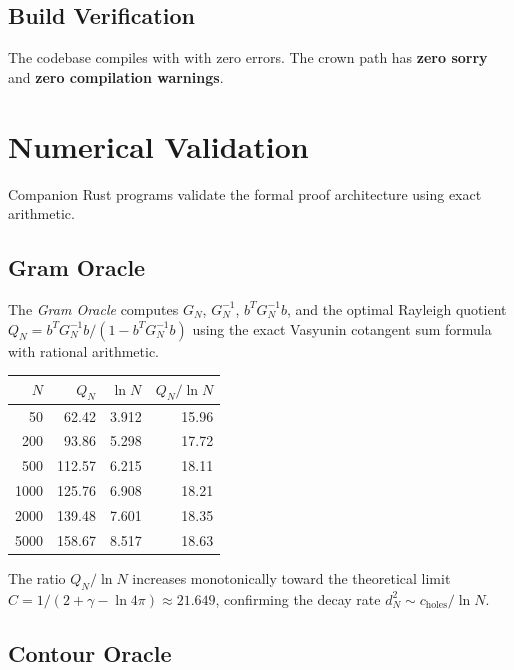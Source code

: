 \documentclass[11pt,a4paper]{article}
\begin{document}
\subsection{Build Verification}

The codebase compiles with  with zero
errors. The crown path has \textbf{zero sorry} and
\textbf{zero compilation warnings}.

\section{Numerical Validation}
\label{sec:numerical}

Companion Rust programs validate the formal proof architecture using
exact arithmetic.

\subsection{Gram Oracle}

The \emph{Gram Oracle} computes $G_N$, $G_N^{-1}$, $b^T G_N^{-1} b$,
and the optimal Rayleigh quotient $Q_N = b^T G_N^{-1} b / (1 - b^T G_N^{-1} b)$
using the exact Vasyunin cotangent sum formula with rational arithmetic.

\begin{center}
\begin{tabular}{@{}rrcr@{}}
\toprule
$N$ & $Q_N$ & $\ln N$ & $Q_N / \ln N$ \\
\midrule
50 & 62.42 & 3.912 & 15.96 \\
200 & 93.86 & 5.298 & 17.72 \\
500 & 112.57 & 6.215 & 18.11 \\
1000 & 125.76 & 6.908 & 18.21 \\
2000 & 139.48 & 7.601 & 18.35 \\
5000 & 158.67 & 8.517 & 18.63 \\
\bottomrule
\end{tabular}
\end{center}

The ratio $Q_N / \ln N$ increases monotonically toward the theoretical
limit $C = 1/(2 + \gamma - \ln 4\pi) \approx 21.649$, confirming
the decay rate $d_N^2 \sim c_{\text{holes}} / \ln N$.

\subsection{Contour Oracle}
\end{document}
